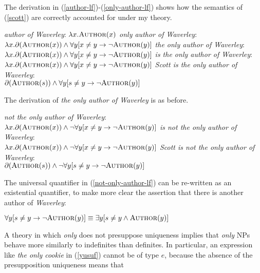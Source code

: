 The derivation in (\ref{author-lf})-(\ref{only-author-lf}) shows how the semantics of (\ref{scott}) are correctly accounted for under my theory.

\begin{exe}
	\ex \label{author-lf} \textit{author of Waverley}: $\lambda x . \textsc{Author}(x)$
	\ex \textit{only author of Waverley}: $\lambda x . \partial(\textsc{Author}(x)) \land \forall y [ x \ne y \to \neg \textsc{Author}(y) ]$
	\ex \textit{the only author of Waverley}: $\lambda x . \partial(\textsc{Author}(x)) \land \forall y [ x \ne y \to \neg \textsc{Author}(y) ]$
	\ex \textit{is the only author of Waverley}: $\lambda x . \partial(\textsc{Author}(x)) \land \forall y [ x \ne y \to \neg \textsc{Author}(y) ]$
	\ex \label{only-author-lf} \textit{Scott is the only author of Waverley}: \\ $\partial(\textsc{Author}(s)) \land \forall y [ s \ne y \to \neg \textsc{Author}(y) ]$
\end{exe}

The derivation of \textit{the only author of Waverley} is as before.

\begin{exe}
	\ex \textit{not the only author of Waverley}: \\ $\lambda x . \partial(\textsc{Author}(x)) \land \neg  \forall y [ x \ne y \to \neg \textsc{Author}(y) ]$
	\ex \textit{is not the only author of Waverley}: \\ $\lambda x . \partial(\textsc{Author}(x)) \land \neg  \forall y [ x \ne y \to \neg \textsc{Author}(y) ]$
	\ex \label{not-only-author-lf} \textit{Scott is not the only author of Waverley}: \\ $\partial(\textsc{Author}(s)) \land \neg \forall y [ s \ne y \to \neg \textsc{Author}(y) ]$
\end{exe}

The universal quantifier in (\ref{not-only-author-lf}) can be re-written as an existential quantifier, to make more clear the assertion that there is another author of \textit{Waverley}:

\begin{exe}
	\ex $\forall y [ s \ne y \to \neg \textsc{Author}(y) ] \equiv \exists y [ s \ne y \land \textsc{Author}(y) ]$
\end{exe}

A theory in which \textit{only} does not presuppose uniqueness implies that \textit{only} NPs behave more similarly to indefinites than definites. In particular, an expression like \textit{the only cookie} in (\ref{yusuf}) cannot be of type $e$, because the absence of the presupposition uniqueness means that

